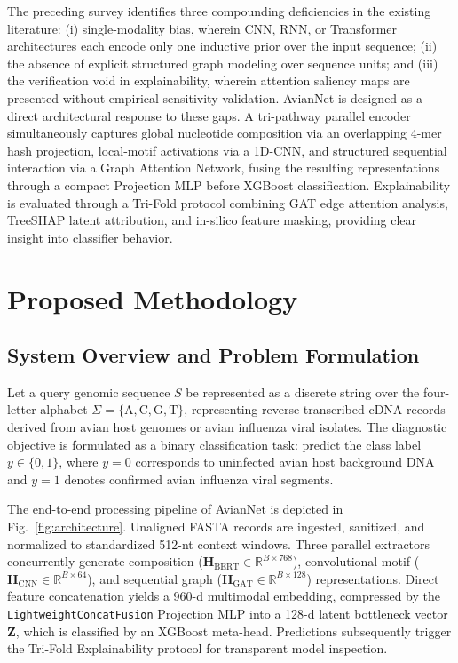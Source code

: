 \documentclass[conference]{IEEEtran}
\begin{document}
The preceding survey identifies three compounding deficiencies in the existing literature: (i) single-modality bias, wherein CNN, RNN, or Transformer architectures each encode only one inductive prior over the input sequence; (ii) the absence of explicit structured graph modeling over sequence units; and (iii) the verification void in explainability, wherein attention saliency maps are presented without empirical sensitivity validation. AvianNet is designed as a direct architectural response to these gaps. A tri-pathway parallel encoder simultaneously captures global nucleotide composition via an overlapping 4-mer hash projection, local-motif activations via a 1D-CNN, and structured sequential interaction via a Graph Attention Network, fusing the resulting representations through a compact Projection MLP before XGBoost classification. Explainability is evaluated through a Tri-Fold protocol combining GAT edge attention analysis, TreeSHAP latent attribution, and in-silico feature masking, providing clear insight into classifier behavior.

\section{Proposed Methodology}
\label{sec:methodology}

\subsection{System Overview and Problem Formulation}
\label{sec:system_overview}

Let a query genomic sequence $S$ be represented as a discrete string over the four-letter alphabet $\Sigma = \{\text{A}, \text{C}, \text{G}, \text{T}\}$, representing reverse-transcribed cDNA records derived from avian host genomes or avian influenza viral isolates. The diagnostic objective is formulated as a binary classification task: predict the class label $y \in \{0, 1\}$, where $y = 0$ corresponds to uninfected avian host background DNA and $y = 1$ denotes confirmed avian influenza viral segments.

The end-to-end processing pipeline of AvianNet is depicted in Fig.~\ref{fig:architecture}. Unaligned FASTA records are ingested, sanitized, and normalized to standardized 512-nt context windows. Three parallel extractors concurrently generate composition ($\mathbf{H}_{\text{BERT}} \in \mathbb{R}^{B \times 768}$), convolutional motif ($\mathbf{H}_{\text{CNN}} \in \mathbb{R}^{B \times 64}$), and sequential graph ($\mathbf{H}_{\text{GAT}} \in \mathbb{R}^{B \times 128}$) representations. Direct feature concatenation yields a 960-d multimodal embedding, compressed by the \texttt{LightweightConcatFusion} Projection MLP into a 128-d latent bottleneck vector $\mathbf{Z}$, which is classified by an XGBoost meta-head. Predictions subsequently trigger the Tri-Fold Explainability protocol for transparent model inspection.
\end{document}

